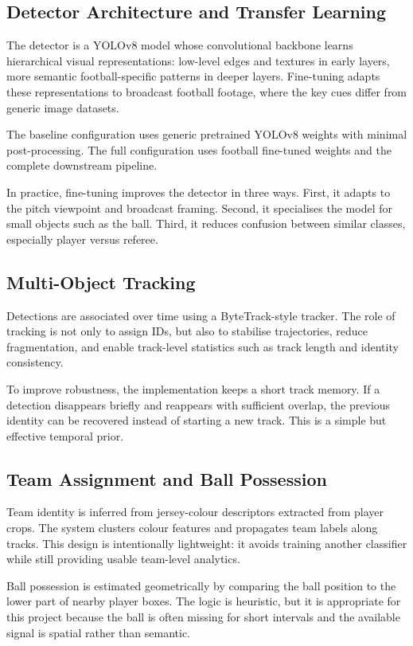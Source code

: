 \documentclass[11pt,a4paper]{article}
\begin{document}
\subsection{Detector Architecture and Transfer Learning}
The detector is a YOLOv8 model whose convolutional backbone learns hierarchical visual representations: low-level edges and textures in early layers, more semantic football-specific patterns in deeper layers. Fine-tuning adapts these representations to broadcast football footage, where the key cues differ from generic image datasets.

The baseline configuration uses generic pretrained YOLOv8 weights with minimal post-processing. The full configuration uses football fine-tuned weights and the complete downstream pipeline.

In practice, fine-tuning improves the detector in three ways. First, it adapts to the pitch viewpoint and broadcast framing. Second, it specialises the model for small objects such as the ball. Third, it reduces confusion between similar classes, especially player versus referee.

\subsection{Multi-Object Tracking}
Detections are associated over time using a ByteTrack-style tracker. The role of tracking is not only to assign IDs, but also to stabilise trajectories, reduce fragmentation, and enable track-level statistics such as track length and identity consistency.

To improve robustness, the implementation keeps a short track memory. If a detection disappears briefly and reappears with sufficient overlap, the previous identity can be recovered instead of starting a new track. This is a simple but effective temporal prior.

\subsection{Team Assignment and Ball Possession}
Team identity is inferred from jersey-colour descriptors extracted from player crops. The system clusters colour features and propagates team labels along tracks. This design is intentionally lightweight: it avoids training another classifier while still providing usable team-level analytics.

Ball possession is estimated geometrically by comparing the ball position to the lower part of nearby player boxes. The logic is heuristic, but it is appropriate for this project because the ball is often missing for short intervals and the available signal is spatial rather than semantic.
\end{document}

